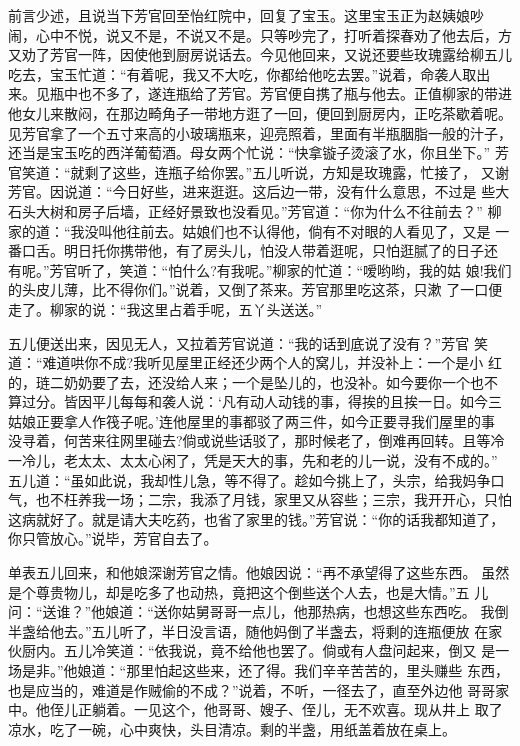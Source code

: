 前言少述，且说当下芳官回至怡红院中，回复了宝玉。这里宝玉正为赵姨娘吵
闹，心中不悦，说又不是，不说又不是。只等吵完了，打听着探春劝了他去后，方
又劝了芳官一阵，因使他到厨房说话去。今见他回来，又说还要些玫瑰露给柳五儿
吃去，宝玉忙道：“有着呢，我又不大吃，你都给他吃去罢。”说着，命袭人取出
来。见瓶中也不多了，遂连瓶给了芳官。芳官便自携了瓶与他去。正值柳家的带进
他女儿来散闷，在那边畸角子一带地方逛了一回，便回到厨房内，正吃茶歇着呢。
见芳官拿了一个五寸来高的小玻璃瓶来，迎亮照着，里面有半瓶胭脂一般的汁子，
还当是宝玉吃的西洋葡萄酒。母女两个忙说：“快拿镟子烫滚了水，你且坐下。”
芳官笑道：“就剩了这些，连瓶子给你罢。”五儿听说，方知是玫瑰露，忙接了，
又谢芳官。因说道：“今日好些，进来逛逛。这后边一带，没有什么意思，不过是
些大石头大树和房子后墙，正经好景致也没看见。”芳官道：“你为什么不往前去？”
柳家的道：“我没叫他往前去。姑娘们也不认得他，倘有不对眼的人看见了，又是
一番口舌。明日托你携带他，有了房头儿，怕没人带着逛呢，只怕逛腻了的日子还
有呢。”芳官听了，笑道：“怕什么?有我呢。”柳家的忙道：“嗳哟哟，我的姑
娘!我们的头皮儿薄，比不得你们。”说着，又倒了茶来。芳官那里吃这茶，只漱
了一口便走了。柳家的说：“我这里占着手呢，五丫头送送。”

五儿便送出来，因见无人，又拉着芳官说道：“我的话到底说了没有？”芳官
笑道：“难道哄你不成?我听见屋里正经还少两个人的窝儿，并没补上：一个是小
红的，琏二奶奶要了去，还没给人来；一个是坠儿的，也没补。如今要你一个也不
算过分。皆因平儿每每和袭人说：‘凡有动人动钱的事，得挨的且挨一日。如今三
姑娘正要拿人作筏子呢。’连他屋里的事都驳了两三件，如今正要寻我们屋里的事
没寻着，何苦来往网里碰去?倘或说些话驳了，那时候老了，倒难再回转。且等冷
一冷儿，老太太、太太心闲了，凭是天大的事，先和老的儿一说，没有不成的。”
五儿道：“虽如此说，我却性儿急，等不得了。趁如今挑上了，头宗，给我妈争口
气，也不枉养我一场；二宗，我添了月钱，家里又从容些；三宗，我开开心，只怕
这病就好了。就是请大夫吃药，也省了家里的钱。”芳官说：“你的话我都知道了，
你只管放心。”说毕，芳官自去了。

单表五儿回来，和他娘深谢芳官之情。他娘因说：“再不承望得了这些东西。
虽然是个尊贵物儿，却是吃多了也动热，竟把这个倒些送个人去，也是大情。”五
儿问：“送谁？”他娘道：“送你姑舅哥哥一点儿，他那热病，也想这些东西吃。
我倒半盏给他去。”五儿听了，半日没言语，随他妈倒了半盏去，将剩的连瓶便放
在家伙厨内。五儿冷笑道：“依我说，竟不给他也罢了。倘或有人盘问起来，倒又
是一场是非。”他娘道：“那里怕起这些来，还了得。我们辛辛苦苦的，里头赚些
东西，也是应当的，难道是作贼偷的不成？”说着，不听，一径去了，直至外边他
哥哥家中。他侄儿正躺着。一见这个，他哥哥、嫂子、侄儿，无不欢喜。现从井上
取了凉水，吃了一碗，心中爽快，头目清凉。剩的半盏，用纸盖着放在桌上。

